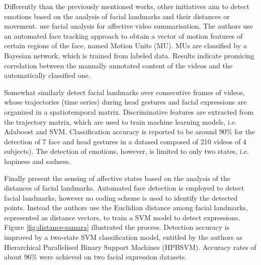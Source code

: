 
Differently than the previously mentioned works, other initiatives aim to detect emotions based on the analysis of facial landmarks and their distances or movement. \textcite{joho2009exploiting} use facial analysis for affective video summarisation. The authors use an automated face tracking approach to obtain a vector of motion features of certain regions of the face, named Motion Units (MU). MUs are classified by a Bayesian network, which is trained from labeled data. Results indicate promicing correlation between the manually annotated content of the videos and the automatically classified one.

Somewhat similarly \textcite{akakin2010spatiotemporal} detect facial landmarks over consecutive frames of videos, whose trajectories (time series) during head gestures and facial expressions are organized in a spatiotemporal matrix. Discriminative features are extracted from the trajectory matrix, which are used to train machine learning models, i.e. Adaboost and SVM. Classification accuracy is reported to be around 90\% for the detection of 7 face and head gestures in a datased composed of 210 videos of 4 subjects). The detection of emotions, however, is limited to only two states, i.e. hapiness and sadness.

Finally \textcite{samara2016sensing} present the sensing of affective states based on the analysis of the distances of facial landmarks. Automated face detection is employed to detect facial landmarks, however no coding scheme is used to identify the detected points. Instead the authors use the Euclidian distance among facial landmarks, represented as distance vectors, to train a SVM model to detect expressions. Figure \ref{fig:distance-samara} illustrated the process. Detection accuracy is improved by a two-state SVM classification model, entitled by the authors as Hierarchical Parallelised Binary Support Machines (HPBSVM). Accuracy rates of about 96\% were achieved on two facial expression datasets.


